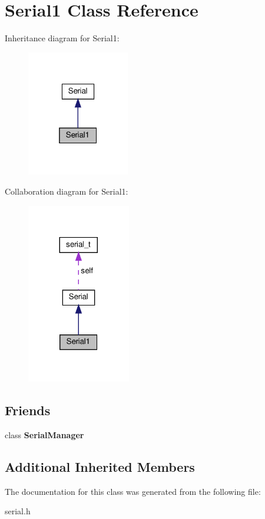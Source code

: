 \hypertarget{classSerial1}{}\section{Serial1 Class Reference}
\label{classSerial1}


Inheritance diagram for Serial1\+:\nopagebreak
\begin{figure}[H]
\begin{center}
\leavevmode
\includegraphics[width=127pt]{classSerial1__inherit__graph}
\end{center}
\end{figure}


Collaboration diagram for Serial1\+:\nopagebreak
\begin{figure}[H]
\begin{center}
\leavevmode
\includegraphics[width=128pt]{classSerial1__coll__graph}
\end{center}
\end{figure}
\subsection*{Friends}
\begin{DoxyCompactItemize}
\item 
\mbox{\label{classSerial1_ae711712f6bc003a5d1156a409a19941b}} 
class {\bfseries Serial\+Manager}
\end{DoxyCompactItemize}
\subsection*{Additional Inherited Members}


The documentation for this class was generated from the following file\+:\begin{DoxyCompactItemize}
\item 
serial.\+h\end{DoxyCompactItemize}
